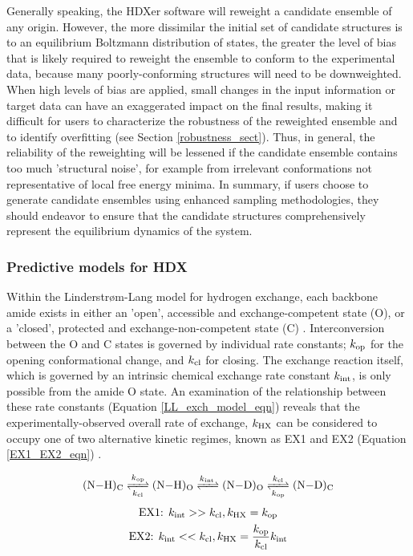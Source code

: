 \documentclass[9pt,tutorial,ASAPversion]{livecoms}
\begin{document}
Generally speaking, the HDXer software will reweight a candidate ensemble of any origin.
However, the more dissimilar the initial set of candidate structures is to an equilibrium Boltzmann distribution of states, the greater the level of bias that is likely required to reweight the ensemble to conform to the experimental data, because many poorly-conforming structures will need to be downweighted.
When high levels of bias are applied, small changes in the input information or target data can have an exaggerated impact on the final results, making it difficult for users to characterize the robustness of the reweighted ensemble and to identify overfitting (see Section \ref{robustness_sect}).
Thus, in general, the reliability of the reweighting will be lessened if the candidate ensemble contains too much 'structural noise', for example from irrelevant conformations not representative of local free energy minima.
In summary, if users choose to generate candidate ensembles using enhanced sampling methodologies, they should endeavor to ensure that the candidate structures comprehensively represent the equilibrium dynamics of the system. 

\subsubsection{Predictive models for HDX}\label{predictivemodel_sect}
Within the Linderstrøm-Lang model for hydrogen exchange, each backbone amide exists in either an 'open', accessible and exchange-competent state (O), or a 'closed', protected and exchange-non-competent state (C) \cite{Hvidt1966, Englander1997, Jensen2016}.
Interconversion between the O and C states is governed by individual rate constants; $k_{\textnormal{op}}$ for the opening conformational change, and $k_{\textnormal{cl}}$ for closing.
The exchange reaction itself, which is governed by an intrinsic chemical exchange rate constant $k_{\textnormal{int}}$, is only possible from the amide O state.
An examination of the relationship between these rate constants (Equation \ref{LL_exch_model_eqn}) reveals that the experimentally-observed overall rate of exchange, $k_{\textnormal{HX}}$ can be considered to occupy one of two alternative kinetic regimes, known as EX1 and EX2 (Equation \ref{EX1_EX2_eqn}) \cite{Jensen2016, Ferraro2004, James2021}.

\begin{equation}\label{LL_exch_model_eqn}
\ce{(N-H)_C <=>[$k$_{op}][$k$_{cl}] (N-H)_O <=>[$k$_{int}][] (N-D)_O <=>[$k$_{cl}][$k$_{op}] (N-D)_C}
\end{equation}
\begin{equation}\label{EX1_EX2_eqn}
\begin{gathered}
\textnormal{EX1:  } k_{\textnormal{int}} >> k_{\textnormal{cl}}  ,  k_{\textnormal{HX}} = k_{\textnormal{op}} \\
\textnormal{EX2:  } k_{\textnormal{int}} << k_{\textnormal{cl}}, k_{\textnormal{HX}} =
\frac{k_{\textnormal{op}}}{k_{\textnormal{cl}}}k_{\textnormal{int}}
\end{gathered}
\end{equation}
\end{document}

